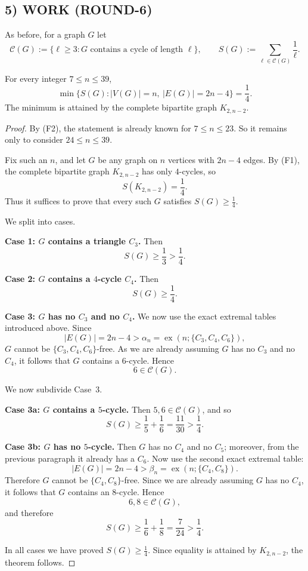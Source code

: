 \subsection*{5) WORK (ROUND-6)}

As before, for a graph $G$ let
\[
\mathcal C(G):=\{\ell\ge 3 : \text{$G$ contains a cycle of length $\ell$}\},
\qquad
S(G):=\sum_{\ell\in\mathcal C(G)}\frac1\ell.
\]

\begin{theorem}[Extension of the $K_{2,n-2}$ line through $n=39$]\label{thm:round6-main}
For every integer $7\le n\le 39$,
\[
\min\{S(G): |V(G)|=n,\ |E(G)|=2n-4\}=\frac14.
\]
The minimum is attained by the complete bipartite graph $K_{2,n-2}$.
\end{theorem}

\begin{proof}
By (F2), the statement is already known for $7\le n\le 23$.
So it remains only to consider $24\le n\le 39$.

Fix such an $n$, and let $G$ be any graph on $n$ vertices with $2n-4$ edges.
By (F1), the complete bipartite graph $K_{2,n-2}$ has only $4$-cycles, so
\[
S(K_{2,n-2})=\frac14.
\]
Thus it suffices to prove that every such $G$ satisfies $S(G)\ge \frac14$.

We split into cases.

\smallskip
\noindent\textbf{Case 1: $G$ contains a triangle $C_3$.}
Then
\[
S(G)\ge \frac13>\frac14.
\]

\smallskip
\noindent\textbf{Case 2: $G$ contains a $4$-cycle $C_4$.}
Then
\[
S(G)\ge \frac14.
\]

\smallskip
\noindent\textbf{Case 3: $G$ has no $C_3$ and no $C_4$.}
We now use the exact extremal tables introduced above.
Since
\[
|E(G)|=2n-4>\alpha_n=\operatorname{ex}(n;\{C_3,C_4,C_6\}),
\]
$G$ cannot be $\{C_3,C_4,C_6\}$-free. As we are already assuming $G$ has no $C_3$ and no $C_4$, it follows that $G$ contains a $6$-cycle. Hence
\[
6\in\mathcal C(G).
\]

We now subdivide Case~3.

\smallskip
\noindent\textbf{Case 3a: $G$ contains a $5$-cycle.}
Then $5,6\in\mathcal C(G)$, and so
\[
S(G)\ge \frac15+\frac16=\frac{11}{30}>\frac14.
\]

\smallskip
\noindent\textbf{Case 3b: $G$ has no $5$-cycle.}
Then $G$ has no $C_4$ and no $C_5$; moreover, from the previous paragraph it already has a $C_6$.
Now use the second exact extremal table:
\[
|E(G)|=2n-4>\beta_n=\operatorname{ex}(n;\{C_4,C_8\}).
\]
Therefore $G$ cannot be $\{C_4,C_8\}$-free. Since we are already assuming $G$ has no $C_4$, it follows that $G$ contains an $8$-cycle. Hence
\[
6,8\in\mathcal C(G),
\]
and therefore
\[
S(G)\ge \frac16+\frac18=\frac7{24}>\frac14.
\]

In all cases we have proved $S(G)\ge \frac14$.
Since equality is attained by $K_{2,n-2}$, the theorem follows.
\end{proof}

